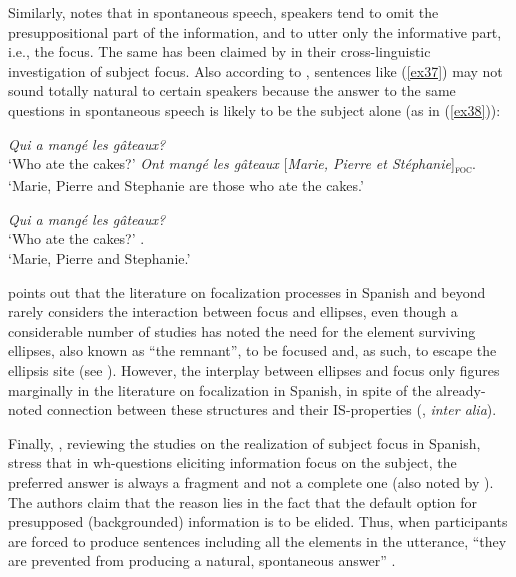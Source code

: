 Similarly, \textcite{krifka2008basic} notes that in spontaneous speech, speakers tend to omit the presuppositional part of the information, and to utter only the informative part, i.e., the focus. The same has been claimed by \textcite{fiedler2006subject} in their cross-linguistic investigation of subject focus.
Also according to \textcite{lahousse2012word}, sentences like (\ref{ex37}) may not sound totally natural to certain speakers because the answer to the same questions in spontaneous speech is likely to be the subject alone (as in (\ref{ex38})):

 \ea \label{ex37}
\ea  \textit{Qui a mangé les gâteaux?}\\
 `Who ate the cakes?'
\ex \textit{Ont mangé les gâteaux} {[\textit{Marie, Pierre et Stéphanie}]\textsubscript{\textsc{foc}}}\normalsize.\\
`Marie, Pierre and Stephanie are those who ate the cakes.'\\

\z \z 

\ea \label{ex38}
\ea \textit{Qui a mangé les gâteaux?}\\
 `Who ate the cakes?'
\normalsize.\\
`Marie, Pierre and Stephanie.' \hfill \parencite[398]{lahousse2012word}   
\z \z 


\textcite{ortega2016focus} points out that the literature on focalization processes in Spanish and beyond rarely considers the interaction between focus and ellipses, even though a considerable number of studies has noted the need for the element surviving ellipses, also known as ``the remnant”,  to be focused and, as such, to escape the ellipsis site (see \cite{merchant1999syntax, merchant1999syntax}). However, the interplay between ellipses and focus only figures marginally in the literature on focalization in Spanish, in spite of the already-noted connection between these structures and their IS-properties (\cite{merchant1999syntax}, \textit{inter alia}). 

Finally, \textcite{vidal2019nota}, reviewing the studies on the realization of subject focus in Spanish, stress that in wh-questions eliciting information focus on the subject, the preferred answer is always a fragment and not a complete one (also noted by \cite{fery2017intonation}). The authors claim that the reason lies in the fact that the default option for presupposed (backgrounded) information is to be elided. Thus, when participants are forced to produce sentences including all the elements in the utterance, ``they are prevented from producing a natural, spontaneous answer” \parencite[9]{vidal2019nota}.


